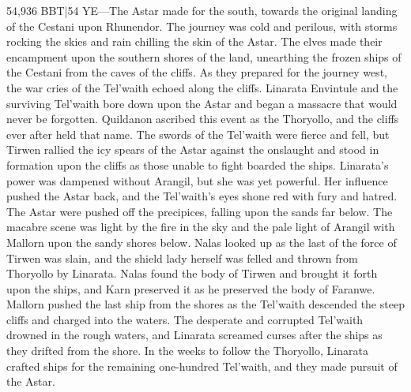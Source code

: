 \documentclass[smalldemyvopaper,11pt,twoside,onecolumn,openright,extrafontsizes]{memoir}
\begin{document}
54,936 BBT|54 YE—The Astar made for the south, towards the original landing of the Cestani upon Rhunendor. The journey was cold and perilous, with storms rocking the skies and rain chilling the skin of the Astar. The elves made their encampment upon the southern shores of the land, unearthing the frozen ships of the Cestani from the caves of the cliffs. As they prepared for the journey west, the war cries of the Tel’waith echoed along the cliffs. Linarata Envintule and the surviving Tel’waith bore down upon the Astar and began a massacre that would never be forgotten. Quildanon ascribed this event as the Thoryollo, and the cliffs ever after held that name. The swords of the Tel’waith were fierce and fell, but Tirwen rallied the icy spears of the Astar against the onslaught and stood in formation upon the cliffs as those unable to fight boarded the ships. Linarata’s power was dampened without Arangil, but she was yet powerful. Her influence pushed the Astar back, and the Tel’waith’s eyes shone red with fury and hatred. The Astar were pushed off the precipices, falling upon the sands far below. The macabre scene was light by the fire in the sky and the pale light of Arangil with Mallorn upon the sandy shores below. Nalas looked up as the last of the force of Tirwen was slain, and the shield lady herself was felled and thrown from Thoryollo by Linarata. Nalas found the body of Tirwen and brought it forth upon the ships, and Karn preserved it as he preserved the body of Faranwe. Mallorn pushed the last ship from the shores as the Tel’waith descended the steep cliffs and charged into the waters. The desperate and corrupted Tel’waith drowned in the rough waters, and Linarata screamed curses after the ships as they drifted from the shore.
	In the weeks to follow the Thoryollo, Linarata crafted ships for the remaining one-hundred Tel’waith, and they made pursuit of the Astar.
\end{document}
